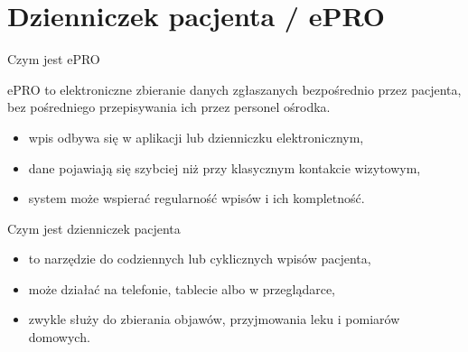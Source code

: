 \section{Dzienniczek pacjenta / ePRO}


\begin{frame}{Czym jest ePRO}
  \begin{DefinitionBox}
    ePRO to elektroniczne zbieranie danych zgłaszanych bezpośrednio przez pacjenta, bez pośredniego przepisywania ich przez personel ośrodka.
  \end{DefinitionBox}

  \vspace{0.35cm}

  \begin{itemize}
    \item wpis odbywa się w aplikacji lub dzienniczku elektronicznym,
    \item dane pojawiają się szybciej niż przy klasycznym kontakcie wizytowym,
    \item system może wspierać regularność wpisów i ich kompletność.
  \end{itemize}
\end{frame}

\begin{frame}{Czym jest dzienniczek pacjenta}
  \begin{itemize}
    \item to narzędzie do codziennych lub cyklicznych wpisów pacjenta,
    \item może działać na telefonie, tablecie albo w przeglądarce,
    \item zwykle służy do zbierania objawów, przyjmowania leku i pomiarów domowych.
  \end{itemize}
\end{frame}

